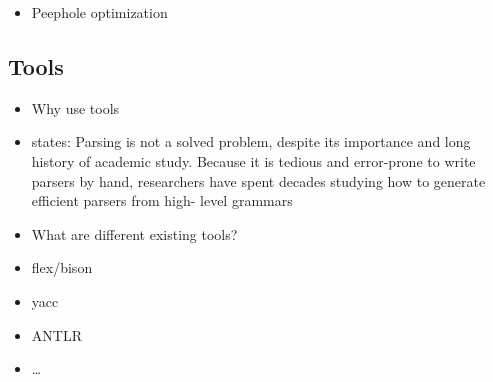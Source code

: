 \begin{itemize}
    \item Peephole optimization~\cite{McKe65}
\end{itemize}

\subsection{Tools}
\label{sec:background_compilerTools}
\begin{itemize}
    \item Why use tools
    \item \cite{PaFi11} states: Parsing is not a solved problem, despite its importance and
    long history of academic study. Because it is tedious and
    error-prone to write parsers by hand, researchers have spent
    decades studying how to generate efficient parsers from high-
    level grammars
    \item What are different existing tools?
    \item flex/bison
    \item yacc
    \item ANTLR
    \item \dots
\end{itemize}